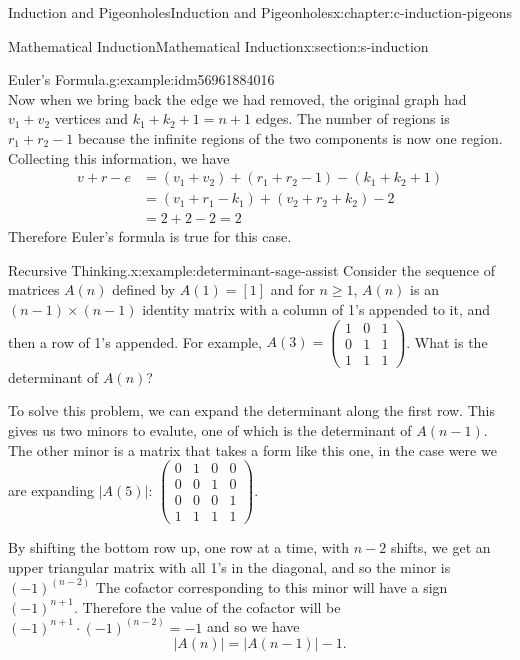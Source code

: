 \documentclass[twoside,10pt,]{book}
\numberwithin{equation}{section}
\begin{document}
\begin{chapterptx}{Induction and Pigeonholes}{}{Induction and Pigeonholes}{}{}{x:chapter:c-induction-pigeons}
\begin{sectionptx}{Mathematical Induction}{}{Mathematical Induction}{}{}{x:section:s-induction}
\begin{example}{Euler's Formula.}{g:example:idm56961884016}
\begin{equation*}
\end{equation*}
Now when we bring back the edge we had removed, the original graph had \(v_1+ v_2\) vertices and \(k_1+k_2+1= n+1\) edges.  The number of regions is \(r_1+ r_2-1\) because the infinite regions of the two components  is now one region.  Collecting this information, we have%
\begin{equation*}
\begin{split}
v+r-e &= \left(v_1+v_2\right)+\left(r_1+ r_2-1\right) -\left(k_1+k_2+1\right)\\
& = \left(v_1+r_1-k_1\right)+ \left(v_2+r_2+k_2\right) -2\\
&=2+2-2 = 2
\end{split}
\end{equation*}
Therefore Euler's formula is true for this case.%
\end{example}
\begin{example}{Recursive Thinking.}{x:example:determinant-sage-assist}%
Consider the sequence of  matrices \(A(n)\) defined by \(A(1)=[1]\) and for \(n \ge 1\), \(A(n)\) is an \((n-1) \times (n-1)\) identity matrix with a column of 1's appended to it, and then a row of 1's appended.  For example, \(A(3)=\begin{pmatrix}1 & 0 & 1\\
0 & 1 & 1\\
1 & 1 & 1 \end{pmatrix}\). What is the determinant of \(A(n)\)?%
\par
To solve this problem, we can expand the determinant along the first row.  This gives us two minors to evalute, one of which is the determinant of \(A(n-1)\).  The other minor is a matrix that takes a form like this one, in the case were we are expanding \(\lvert A(5)\rvert\): \(\begin{pmatrix}
0 & 1 & 0 & 0\\
0 & 0 & 1 & 0\\
0 & 0 & 0 & 1\\
1 & 1 & 1 & 1 \end{pmatrix}\).%
\par
By shifting the bottom row up, one row at a time, with \(n-2\) shifts, we get an upper triangular matrix with all 1's in the diagonal, and so the minor is  \((-1)^{(n-2)}\)  The cofactor corresponding to this minor will have a sign \((-1)^{n+1}\).  Therefore the value of the cofactor will be \((-1)^{n+1}\cdot (-1)^{(n-2)}= -1\) and so we have%
\begin{equation*}
\lvert A(n) \rvert = \lvert A(n-1) \rvert -1\text{.}

\end{equation*}
\end{example}
\end{sectionptx}
\end{chapterptx}
\end{document}
